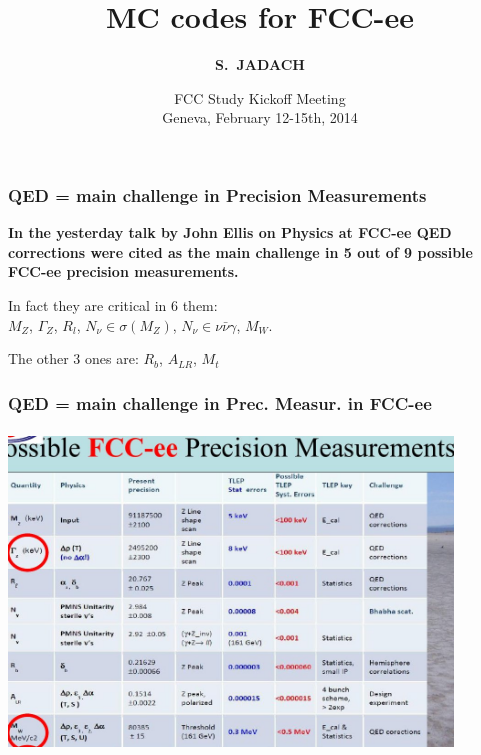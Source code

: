 \documentclass{beamer}
\title[Monte Carlo Methods] %
{ {\bf MC codes for FCC-ee}
} %
\author[S.~Jadach] %
{\Large\bf S.~JADACH }
\institute[Universities of Somewhere and Elsewhere] %
{ {\large\crd IFJ-PAN, Krak\'ow, Poland}\\
  {~~~}\\
  {\footnotesize
  Partly supported by Polish Government grant\\
  {\em Narodowe Centrum Nauki} DEC-2011/03/B/ST2/02632
}}
\date[Short Occasion] %
{\small FCC Study Kickoff Meeting\\
   Geneva,
   February 12-15th, 2014
}
\newcommand{\cbl}{\color{blue}}
\begin{document}
\begin{frame}
  \titlepage
\end{frame}

\begin{frame}[fragile]
\frametitle{\bf QED = main challenge in Precision Measurements}

\Large\bf
In the yesterday talk by John Ellis on Physics at FCC-ee
{\cbl QED corrections} were cited as the main challenge 
{\cbl in 5 out of 9}
possible FCC-ee precision measurements.

\vspace{4mm}
In fact they are critical in 6 them:\\
$M_Z$,\;
$\Gamma_Z$, \;
$R_l$, \;
$N_\nu \in \sigma(M_Z)$, \;
$N_\nu \in \nu\bar\nu\gamma$, \;
$M_W$.

\vspace{3mm}
The other 3 ones are:
$R_b$, \;
$A_{LR}$, \;
$M_{t}$

\end{frame}





\begin{frame}[fragile]
\frametitle{\bf QED = main challenge in Prec. Measur. in FCC-ee}

\vspace{-2mm}
{\includegraphics[width=118mm,height=85mm]{JEllis.jpg}}

\end{frame}
\end{document}
